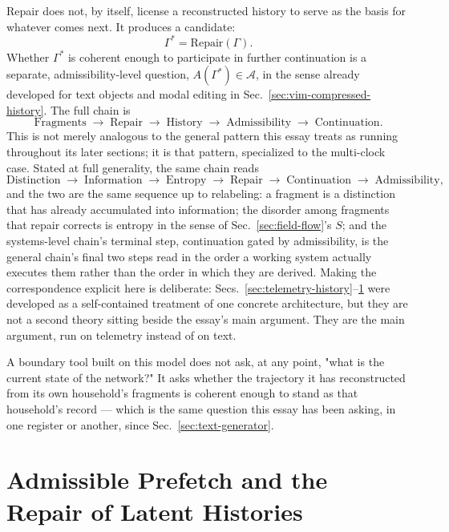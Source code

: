 \documentclass[12pt,a4paper]{article}
\theoremstyle{plain}
\theoremstyle{definition}
\theoremstyle{remark}
\newcommand{\Sfield}{S}
\begin{document}
Repair does not, by itself, license a reconstructed history to serve as the basis for whatever comes next. It produces a candidate:
\[
\Gamma^{*} = \mathrm{Repair}(\Gamma).
\]
Whether $\Gamma^{*}$ is coherent enough to participate in further continuation is a separate, admissibility-level question, $A(\Gamma^{*}) \in \mathcal{A}$, in the sense already developed for text objects and modal editing in Sec.~\ref{sec:vim-compressed-history}. The full chain is
\[
\text{Fragments} \;\to\; \text{Repair} \;\to\; \text{History} \;\to\; \text{Admissibility} \;\to\; \text{Continuation}.
\]
This is not merely analogous to the general pattern this essay treats as running throughout its later sections; it is that pattern, specialized to the multi-clock case. Stated at full generality, the same chain reads
\[
\text{Distinction} \;\to\; \text{Information} \;\to\; \text{Entropy} \;\to\; \text{Repair} \;\to\; \text{Continuation} \;\to\; \text{Admissibility},
\]
and the two are the same sequence up to relabeling: a fragment is a distinction that has already accumulated into information; the disorder among fragments that repair corrects is entropy in the sense of Sec.~\ref{sec:field-flow}'s $\Sfield$; and the systems-level chain's terminal step, continuation gated by admissibility, is the general chain's final two steps read in the order a working system actually executes them rather than the order in which they are derived. Making the correspondence explicit here is deliberate: Secs.~\ref{sec:telemetry-history}--\ref{sec:admissible-prefetch} were developed as a self-contained treatment of one concrete architecture, but they are not a second theory sitting beside the essay's main argument. They are the main argument, run on telemetry instead of on text.

A boundary tool built on this model does not ask, at any point, "what is the current state of the network?" It asks whether the trajectory it has reconstructed from its own household's fragments is coherent enough to stand as that household's record — which is the same question this essay has been asking, in one register or another, since Sec.~\ref{sec:text-generator}.

\section{Admissible Prefetch and the Repair of Latent Histories}
\label{sec:admissible-prefetch}
\end{document}
